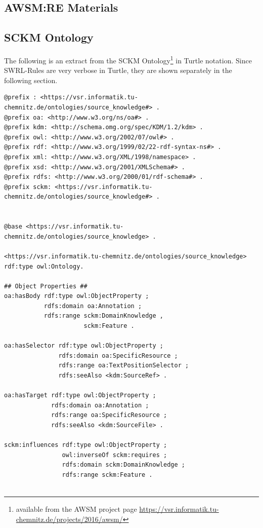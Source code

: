 \begin{appendix}
\chapter{AWSM:RE Materials}
\section{SCKM Ontology}\label{sec:sckm-ontology}
\vspace{15pt}
The following is an extract from the SCKM Ontology\footnote{available from the AWSM project page \url{https://vsr.informatik.tu-chemnitz.de/projects/2016/awsm/}} in Turtle notation. Since SWRL-Rules are very verbose in Turtle, they are shown separately in the following section.
\begin{lstlisting}[language=turtle, captionpos=t, caption=SCKM Ontology Extract]
@prefix : <https://vsr.informatik.tu-chemnitz.de/ontologies/source_knowledge#> .
@prefix oa: <http://www.w3.org/ns/oa#> .
@prefix kdm: <http://schema.omg.org/spec/KDM/1.2/kdm> .
@prefix owl: <http://www.w3.org/2002/07/owl#> .
@prefix rdf: <http://www.w3.org/1999/02/22-rdf-syntax-ns#> .
@prefix xml: <http://www.w3.org/XML/1998/namespace> .
@prefix xsd: <http://www.w3.org/2001/XMLSchema#> .
@prefix rdfs: <http://www.w3.org/2000/01/rdf-schema#> .
@prefix sckm: <https://vsr.informatik.tu-chemnitz.de/ontologies/source_knowledge#> .


@base <https://vsr.informatik.tu-chemnitz.de/ontologies/source_knowledge> .

<https://vsr.informatik.tu-chemnitz.de/ontologies/source_knowledge> rdf:type owl:Ontology.
                                                                
## Object Properties ##
oa:hasBody rdf:type owl:ObjectProperty ;
           rdfs:domain oa:Annotation ;
           rdfs:range sckm:DomainKnowledge ,
                      sckm:Feature .

oa:hasSelector rdf:type owl:ObjectProperty ;
               rdfs:domain oa:SpecificResource ;
               rdfs:range oa:TextPositionSelector ;
               rdfs:seeAlso <kdm:SourceRef> .

oa:hasTarget rdf:type owl:ObjectProperty ;
             rdfs:domain oa:Annotation ;
             rdfs:range oa:SpecificResource ;
             rdfs:seeAlso <kdm:SourceFile> .

sckm:influences rdf:type owl:ObjectProperty ;
                owl:inverseOf sckm:requires ;
                rdfs:domain sckm:DomainKnowledge ;
                rdfs:range sckm:Feature .


\end{lstlisting}
\end{appendix}
